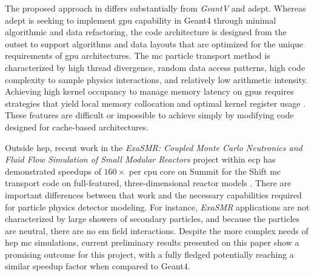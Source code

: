 The proposed approach in \celeritas differs substantially from \emph{GeantV} and
\acs{adept}. Whereas \acs{adept} is seeking to implement \ac{gpu} capability in
Geant4 through minimal algorithmic and data refactoring, the \celeritas code
architecture is designed from the outset to support algorithms and data layouts
that are optimized for the unique requirements of \ac{gpu} architectures. The
\ac{mc} particle transport method is characterized by high thread divergence,
random data access patterns, high code complexity to sample physics
interactions, and relatively low arithmetic intensity.  Achieving high kernel
occupancy to manage memory latency on \acp{gpu} requires strategies that yield
local memory collocation and optimal kernel register usage
\cite{hamilton_continuous-energy_2019}.  These features are difficult or
impossible to achieve simply by modifying code designed for cache-based
architectures.

Outside \ac{hep}, recent work in the \emph{ExaSMR: Coupled Monte Carlo
Neutronics and Fluid Flow Simulation of Small Modular Reactors} project within
\ac{ecp} has demonstrated speedups of $160\times$ per \ac{cpu} core on Summit
for the Shift \ac{mc} transport code on full-featured, three-dimensional reactor
models \cite{hamilton_continuous-energy_2019}. There are important differences
between that work and the necessary capabilities required for particle physics
detector modeling. For instance, \emph{ExaSMR} applications are not
characterized by large showers of secondary particles, and because the particles
are neutral, there are no \ac{em} field interactions. Despite the more complex
needs of \ac{hep} \ac{mc} simulations, current preliminary results presented on
this paper show a promising outcome for this project, with a fully fledged
\celeritas potentially reaching a similar speedup factor when compared to
Geant4.
